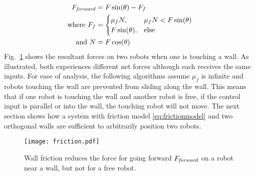 \begin{align}
F_{\text{\emph{forward}}} &=  F \sin(\theta) - F_f  \nonumber \\
\text{where }  F_f &= \begin{cases}  \mu_f N, &  \mu_f N < F \sin(\theta)  \label{eq:frictionmodel}  \\
F \sin(\theta), & \text{else} \end{cases} \\ %
\text{and } N &= F \cos(\theta) \nonumber
\end{align}
 Fig.~\ref{fig:friction} shows the resultant forces on two robots when one is touching a wall. As illustrated, both experiences different net forces although each receives the same inputs.
  For ease of analysis, the following algorithms assume $\mu_f$ is infinite and robots touching the wall are prevented from sliding along the wall.
This means that if one robot is touching the wall and another robot is free, if the control input is parallel or into the wall, the touching robot will not move. 
The next section shows how a system with friction model \eqref{eq:frictionmodel} and two orthogonal walls are sufficient to arbitrarily position two robots. 
\begin{figure}[h]
\begin{center}
\texttt{[image: friction.pdf]} 
\vspace{-1em}
\caption{Wall friction reduces the force for going forward $F_{\text{\emph{forward}}}$ on a robot near a wall, but not for a free robot.}
\label{fig:friction}
\end{center}
\end{figure} 




